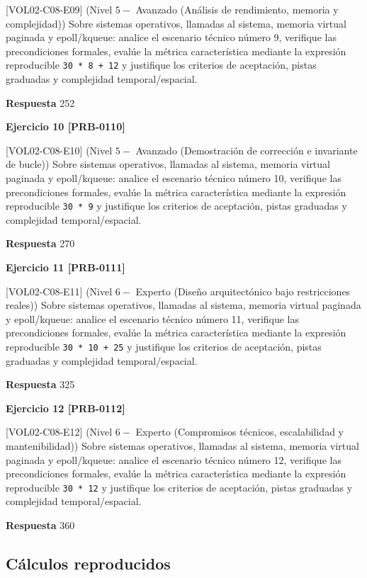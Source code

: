 \documentclass{book}
\begin{document}
[VOL02-C08-E09] (Nivel \(5 -\) Avanzado (Análisis de rendimiento, memoria y complejidad)) Sobre sistemas operativos, llamadas al sistema, memoria virtual paginada y epoll/kqueue: analice el escenario técnico número 9, verifique las precondiciones formales, evalúe la métrica característica mediante la expresión reproducible \texttt{30 * 8 + 12} y justifique los criterios de aceptación, pistas graduadas y complejidad temporal/espacial.

\noindent\textbf{Respuesta} 252

\noindent\textbf{Ejercicio 10 [PRB-0110]}

[VOL02-C08-E10] (Nivel \(5 -\) Avanzado (Demostración de corrección e invariante de bucle)) Sobre sistemas operativos, llamadas al sistema, memoria virtual paginada y epoll/kqueue: analice el escenario técnico número 10, verifique las precondiciones formales, evalúe la métrica característica mediante la expresión reproducible \texttt{30 * 9} y justifique los criterios de aceptación, pistas graduadas y complejidad temporal/espacial.

\noindent\textbf{Respuesta} 270

\noindent\textbf{Ejercicio 11 [PRB-0111]}

[VOL02-C08-E11] (Nivel \(6 -\) Experto (Diseño arquitectónico bajo restricciones reales)) Sobre sistemas operativos, llamadas al sistema, memoria virtual paginada y epoll/kqueue: analice el escenario técnico número 11, verifique las precondiciones formales, evalúe la métrica característica mediante la expresión reproducible \texttt{30 * 10 + 25} y justifique los criterios de aceptación, pistas graduadas y complejidad temporal/espacial.

\noindent\textbf{Respuesta} 325

\noindent\textbf{Ejercicio 12 [PRB-0112]}

[VOL02-C08-E12] (Nivel \(6 -\) Experto (Compromisos técnicos, escalabilidad y mantenibilidad)) Sobre sistemas operativos, llamadas al sistema, memoria virtual paginada y epoll/kqueue: analice el escenario técnico número 12, verifique las precondiciones formales, evalúe la métrica característica mediante la expresión reproducible \texttt{30 * 12} y justifique los criterios de aceptación, pistas graduadas y complejidad temporal/espacial.

\noindent\textbf{Respuesta} 360

\subsection*{Cálculos reproducidos}
\end{document}
